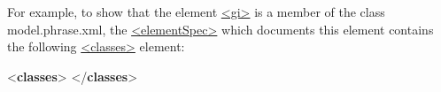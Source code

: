 For example, to show that the element \hyperref[TEI.gi]{<gi>} is a member of the class \textsf{model.phrase.xml}, the \hyperref[TEI.elementSpec]{<elementSpec>} which documents this element contains the following \hyperref[TEI.classes]{<classes>} element: \par\bgroup{}\exampleFont \begin{shaded}\noindent\mbox{}{<\textbf{classes}>}\mbox{}\newline 
{}\mbox{}\newline 
{</\textbf{classes}>}\end{shaded}\egroup\par 
